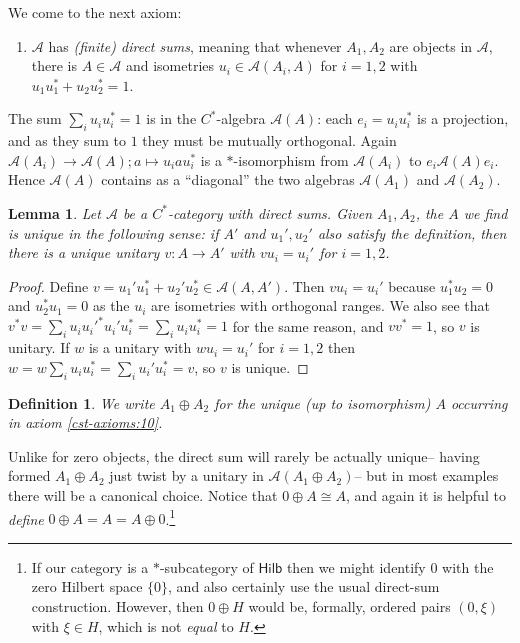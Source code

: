 \documentclass[a4paper,11pt]{article}
\theoremstyle{plain}
\newtheorem{lemma}[proposition]{Lemma}
\newtheorem{definition}[proposition]{Definition}
\theoremstyle{remark}
\newcommand{\mc}[1]{\mathcal{#1}}
\newcommand{\catHilb}{\textsf{Hilb}}
\begin{document}
We come to the next axiom:

\begin{enumerate}[(1), start=10]
  \item\label{cst-axioms:10} $\mc A$ has \emph{(finite) direct sums}, meaning that whenever $A_1, A_2$ are objects in $\mc A$, there is $A\in\mc A$ and isometries $u_i \in \mc A(A_i, A)$ for $i=1,2$ with $u_1u_1^* + u_2u_2^* = 1$.
\end{enumerate}

The sum $\sum_i u_i u_i^*=1$ is in the $C^*$-algebra $\mc A(A)$: each $e_i = u_i u_i^*$ is a projection, and as they sum to $1$ they must be mutually orthogonal.  Again $\mc A(A_i) \to \mc A(A); a \mapsto u_i a u_i^*$ is a $*$-isomorphism from $\mc A(A_i)$ to $e_i \mc A(A) e_i$.  Hence $\mc A(A)$ contains as a ``diagonal'' the two algebras $\mc A(A_1)$ and $\mc A(A_2)$.

\begin{lemma}
Let $\mc A$ be a $C^*$-category with direct sums.  Given $A_1, A_2$, the $A$ we find is unique in the following sense: if $A'$ and $u_1', u_2'$ also satisfy the definition, then there is a unique unitary $v\colon A\to A'$ with $v u_i = u_i'$ for $i=1,2$.
\end{lemma}
\begin{proof}
Define $v = u_1' u_1^* + u_2' u_2^* \in \mc A(A,A')$.  Then $v u_i = u_i'$ because $u_1^* u_2 = 0$ and $u_2^* u_1=0$ as the $u_i$ are isometries with orthogonal ranges.  We also see that $v^*v = \sum_i u_i u_i'^* u_i' u_i^* = \sum_i u_i u_i^* = 1$ for the same reason, and $vv^*=1$, so $v$ is unitary.  If $w$ is a unitary with $w u_i = u_i'$ for $i=1,2$ then $w = w\sum_i u_iu_i^* = \sum_i u_i' u_i^* = v$, so $v$ is unique.
\end{proof}

\begin{definition}\label{defn:direct_sum_notation}
We write $A_1 \oplus A_2$ for the unique (up to isomorphism) $A$ occurring in axiom \ref{cst-axioms:10}.
\end{definition}

Unlike for zero objects, the direct sum will rarely be actually unique-- having formed $A_1 \oplus A_2$ just twist by a unitary in $\mc A(A_1\oplus A_2)$-- but in most examples there will be a canonical choice.  Notice that $0 \oplus A \cong A$, and again it is helpful to \emph{define} $0\oplus A = A = A\oplus 0$.\footnote{If our category is a $*$-subcategory of $\catHilb$ then we might identify $0$ with the zero Hilbert space $\{0\}$, and also certainly use the usual direct-sum construction.  However, then $0 \oplus H$ would be, formally, ordered pairs $(0,\xi)$ with $\xi\in H$, which is not \emph{equal} to $H$.}
\end{document}
